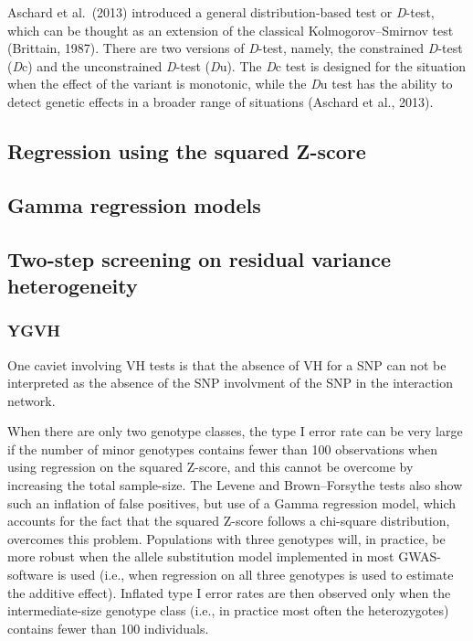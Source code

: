 \documentclass[
]{book}
\begin{document}
Aschard et al.~(2013) introduced a general distribution-based test or \emph{D}-test, which can be thought as an extension of the classical Kolmogorov--Smirnov test (Brittain, 1987). There are two versions of \emph{D}-test, namely, the constrained \emph{D}-test (\emph{D}c) and the unconstrained \emph{D}-test (\emph{D}u). The \emph{D}c test is designed for the situation when the effect of the variant is monotonic, while the \emph{D}u test has the ability to detect genetic effects in a broader range of situations (Aschard et al., 2013).

\hypertarget{regression-using-the-squared-z-score}{%
\subsection{Regression using the squared Z-score}\label{regression-using-the-squared-z-score}}

\hypertarget{gamma-regression-models}{%
\subsection{Gamma regression models}\label{gamma-regression-models}}

\hypertarget{two-step-screening-on-residual-variance-heterogeneity}{%
\subsection{Two-step screening on residual variance heterogeneity}\label{two-step-screening-on-residual-variance-heterogeneity}}

\hypertarget{ygvh}{%
\subsubsection{YGVH}\label{ygvh}}

One caviet involving VH tests is that the absence of VH for a SNP can not be interpreted as the absence of the SNP involvment of the SNP in the interaction network.

When there are only two genotype classes, the type I error rate can be very large if the number of minor genotypes contains fewer than 100 observations when using regression on the squared Z-score, and this cannot be overcome by increasing the total sample-size. The Levene and Brown--Forsythe tests also show such an inflation of false positives, but use of a Gamma regression model, which accounts for the fact that the squared Z-score follows a chi-square distribution, overcomes this problem. Populations with three genotypes will, in practice, be more robust when the allele substitution model implemented in most GWAS-software is used (i.e., when regression on all three genotypes is used to estimate the additive effect). Inflated type I error rates are then observed only when the intermediate-size genotype class (i.e., in practice most often the heterozygotes) contains fewer than 100 individuals.
\end{document}
